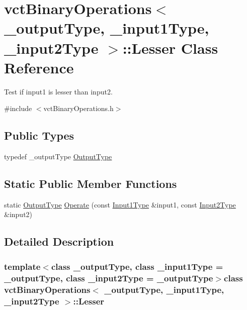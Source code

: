 \hypertarget{classvct_binary_operations_1_1_lesser}{}\section{vct\+Binary\+Operations$<$ \+\_\+output\+Type, \+\_\+input1\+Type, \+\_\+input2\+Type $>$\+:\+:Lesser Class Reference}
\label{classvct_binary_operations_1_1_lesser}


Test if input1 is lesser than input2.  




{\ttfamily \#include $<$vct\+Binary\+Operations.\+h$>$}

\subsection*{Public Types}
\begin{DoxyCompactItemize}
\item 
typedef \+\_\+output\+Type \hyperlink{classvct_binary_operations_1_1_lesser_a3f6be40aec12d4a06f0a16d729f765da}{Output\+Type}
\end{DoxyCompactItemize}
\subsection*{Static Public Member Functions}
\begin{DoxyCompactItemize}
\item 
static \hyperlink{classvct_binary_operations_1_1_lesser_a3f6be40aec12d4a06f0a16d729f765da}{Output\+Type} \hyperlink{classvct_binary_operations_1_1_lesser_a6649ee7e25530348419b0de177084357}{Operate} (const \hyperlink{classvct_binary_operations_a5e56a66a012d6a28c539a08a0021c45e}{Input1\+Type} \&input1, const \hyperlink{classvct_binary_operations_a929119af557a04a16b4d854981e49e1b}{Input2\+Type} \&input2)
\end{DoxyCompactItemize}


\subsection{Detailed Description}
\subsubsection*{template$<$class \+\_\+output\+Type, class \+\_\+input1\+Type = \+\_\+output\+Type, class \+\_\+input2\+Type = \+\_\+output\+Type$>$class vct\+Binary\+Operations$<$ \+\_\+output\+Type, \+\_\+input1\+Type, \+\_\+input2\+Type $>$\+::\+Lesser}

